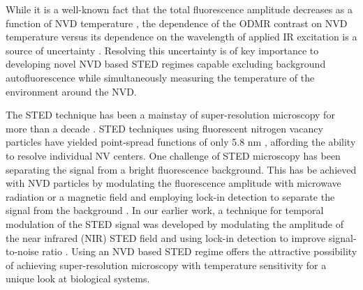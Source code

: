 While it is a well-known fact that the total fluorescence amplitude decreases as a function of NVD temperature \cite{Lai2013}, the dependence of the ODMR 
contrast on NVD temperature versus its dependence on the wavelength of applied IR excitation is a source of uncertainty \cite{Blakley2016}.  Resolving this 
uncertainty is of key importance to developing novel NVD based STED regimes capable excluding background autofluorescence while simultaneously 
measuring the temperature of the environment around the NVD.

The STED technique has been a mainstay of super-resolution microscopy for more than a decade
\cite{Hell2003,Hell2009,Eggeling2009}.  STED techniques using fluorescent nitrogen 
vacancy particles have yielded point-spread functions of only 5.8 nm \cite{Rittweger2009,Han2009}, 
affording the ability to resolve individual NV centers.  One 
challenge of STED microscopy has been separating the signal from a bright fluorescence background.  This has be achieved with NVD particles by 
modulating the fluorescence amplitude with microwave radiation or a magnetic field and employing lock-in detection to separate the signal from the 
background \cite{Chapman2013,Sarkar2014}.  In our earlier work, a technique for temporal modulation of the STED signal was developed by modulating the amplitude of the 
near infrared (NIR) STED field and using lock-in detection to improve signal-to-noise ratio \cite{Doronina-Amitonova2015}.  Using an NVD based STED regime offers the 
attractive possibility of achieving super-resolution microscopy with temperature sensitivity for a unique look at biological systems.